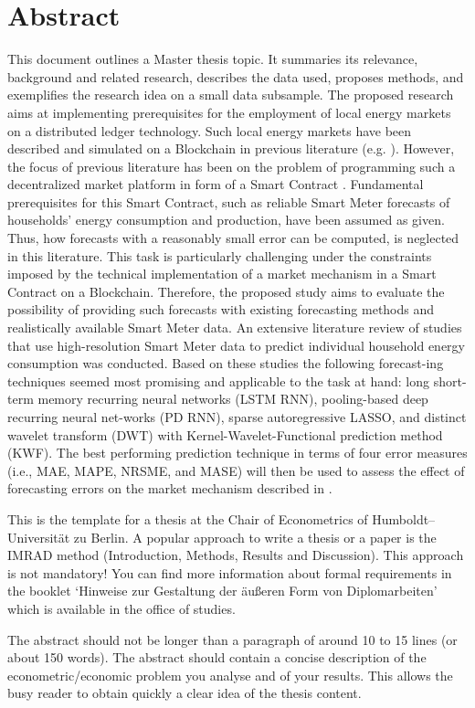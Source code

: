 \section*{Abstract}
This document outlines a Master thesis topic. It summaries its relevance, background and related research, describes the data used, proposes methods, and exemplifies the research idea on a small data subsample.
The proposed research aims at implementing prerequisites for the employment of local energy markets on a distributed ledger technology. Such local energy markets have been described and simulated on a Blockchain in previous literature (e.g. \cite{Mengelkamp:2018a}). However, the focus of previous literature has been on the problem of programming such a decentralized market platform in form of a Smart Contract . Fundamental prerequisites for this Smart Contract, such as reliable Smart Meter forecasts of households’ energy consumption and production, have been assumed as given. Thus, how forecasts with a reasonably small error can be computed, is neglected in this literature. This task is particularly challenging under the constraints imposed by the technical implementation of a market mechanism in a Smart Contract on a Blockchain.
Therefore, the proposed study aims to evaluate the possibility of providing such forecasts with existing forecasting methods and realistically available Smart Meter data. An extensive literature review of studies that use high-resolution Smart Meter data to predict individual household energy consumption was conducted. Based on these studies the following forecast-ing techniques seemed most promising and applicable to the task at hand: long short-term memory recurring neural networks (LSTM RNN), pooling-based deep recurring neural net-works (PD RNN), sparse autoregressive LASSO, and distinct wavelet transform (DWT) with Kernel-Wavelet-Functional prediction method (KWF). The best performing prediction technique in terms of four error measures (i.e., MAE, MAPE, NRSME, and MASE) will then be used to assess the effect of forecasting errors on the market mechanism described in \cite{Mengelkamp:2018a}.

This is the template for a thesis at the Chair of Econometrics of
Humboldt--Universit\"at zu Berlin. A popular approach to write a
thesis or a paper is the IMRAD method (Introduction, Methods,
Results and Discussion). This approach is not mandatory! You can
find more information about formal requirements in the booklet
`Hinweise zur Gestaltung der \"au\ss eren Form von Diplomarbeiten' which is available in the office of studies.

The abstract should not be longer than a paragraph of around 10 to 15 lines (or about 150 words). The abstract should contain a
concise description of the econometric/economic problem you
analyse and of your results. This allows the busy reader to obtain quickly a clear idea of the thesis content.
